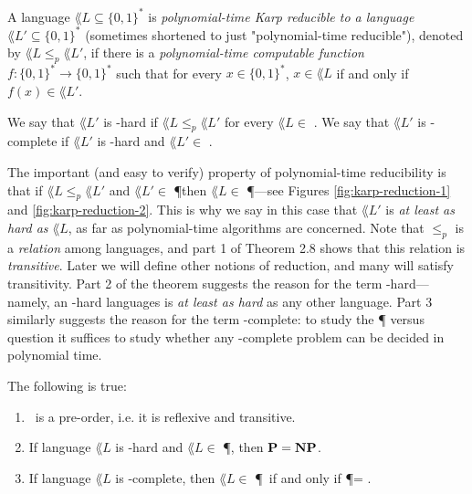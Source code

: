 \begin{definition}
	A language $\lang{L} \subseteq \{0,1\}^*$ is \emph{polynomial-time Karp reducible to a language} $\lang{L}' \subseteq \{0,1\}^*$ (sometimes shortened to just "polynomial-time reducible"), denoted by $\lang{L} \leq_p \lang{L}'$, if there is a \emph{polynomial-time computable function} $f : \{0,1\}^* \to \{0,1\}^*$ such that for every $x \in \{0,1\}^*$, $x \in \lang{L}$ if and only if $f(x) \in \lang{L}'$.

	We say that $\lang{L}'$ is \NP-hard if $\lang{L} \leq_p \lang{L}'$ for every $\lang{L} \in$ \NP. We say that $\lang{L}'$ is \NP-complete if $\lang{L}'$ is \NP-hard and $\lang{L}' \in$ \NP.
\end{definition}

\begin{marginfigure}
	\centering
	
	\caption{}
	\label{fig:karp-reduction-1}
\end{marginfigure}
\begin{marginfigure}
	\centering
	
	\caption{}
	\label{fig:karp-reduction-2}
\end{marginfigure}

The important (and easy to verify) property of polynomial-time reducibility is that if $\lang{L} \leq_p \lang{L}'$ and $\lang{L}' \in$ \P then $\lang{L} \in$ \P---see Figures \ref{fig:karp-reduction-1} and \ref{fig:karp-reduction-2}. This is why we say in this case that $\lang{L}'$ is \emph{at least as hard as} $\lang{L}$, as far as polynomial-time algorithms are concerned. Note that $\leq_p$ is a \emph{relation} among languages, and part 1 of Theorem 2.8 shows that this relation is \emph{transitive}. Later we will define other notions of reduction, and many will satisfy transitivity. Part 2 of the theorem suggests the reason for the term \NP-hard---namely, an \NP-hard languages is \emph{at least as hard} as any other \NP{} language. Part 3 similarly suggests the reason for the term \NP-complete: to study the \P{} versus \NP{} question it suffices to study whether any \NP-complete problem can be decided in polynomial time.

\begin{theorem}
	The following is true:
	\begin{enumerate}
		\item \karpred~is a pre-order, i.e. it is reflexive and transitive.
		\item If language $\lang{L}$ is \NP-hard and $\lang{L} \in$ \P, then $\textbf{P} = \textbf{NP}$.
		\item If language $\lang{L}$ is \NP-complete, then $\lang{L} \in$ \P~if and only if \P = \NP.
	\end{enumerate}
	\label{thm:pre-order-reduc-p=np}
\end{theorem}

